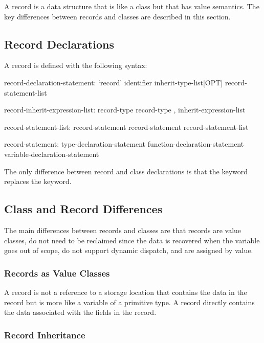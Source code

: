 \label{Records}

A record is a data structure that is like a class but that has value
semantics.  The key differences between records and classes are
described in this section.

\subsection{Record Declarations}
\label{Record_Declarations}

A record is defined with the following syntax:
\begin{syntax}
record-declaration-statement:
  `record' identifier inherit-type-list[OPT] {
    record-statement-list }

record-inherit-expression-list:
  record-type
  record-type , inherit-expression-list

record-statement-list:
  record-statement
  record-statement record-statement-list

record-statement:
  type-declaration-statement
  function-declaration-statement
  variable-declaration-statement
\end{syntax}
The only difference between record and class declarations is that
the  keyword replaces the  keyword.

\subsection{Class and Record Differences}
\label{Class_and_Record_Differences}

The main differences between records and classes are that records are
value classes, do not need to be reclaimed since the data is recovered
when the variable goes out of scope, do not support dynamic dispatch,
and are assigned by value.

\subsubsection{Records as Value Classes}
\label{Records_as_Value_Classes}

A record is not a reference to a storage location that contains the
data in the record but is more like a variable of a primitive type.  A
record directly contains the data associated with the fields in the
record.

\subsubsection{Record Inheritance}
\label{Record_Inheritance}

